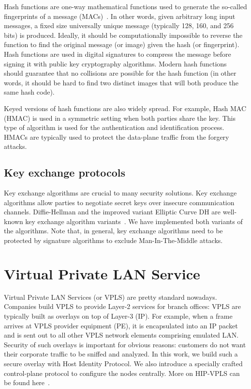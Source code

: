 Hash functions are one-way mathematical functions used to generate the so-called 
fingerprints of a message (MACs)~\cite{Stinson:Cryptography}. In other words, given arbitrary long input messages, 
a fixed size universally unique message (typically 128, 160, and 256 bits) is produced. 
Ideally, it should be computationally impossible to reverse the function to find the 
original message (or image) given the hash (or fingerprint). Hash functions are used 
in digital signatures to compress the message before signing it with public key 
cryptography algorithms. Modern hash functions should guarantee that no collisions 
are possible for the hash function (in other words, it should be hard to find two 
distinct images that will both produce the same hash code). 

Keyed versions of hash functions are also widely spread. For example, Hash MAC (HMAC) 
is used in a symmetric setting when both parties share the key. This type of algorithm 
is used for the authentication and identification process. HMACs are typically used 
to protect the data-plane traffic from the forgery attacks. 


\subsection{Key exchange protocols}

Key exchange algorithms are crucial to many security solutions. Key exchange algorithms 
allow parties to negotiate secret keys over insecure communication channels. Diffie-Hellman 
and the improved variant Elliptic Curve DH are well-known key exchange algorithm variants~\cite{Stinson:Cryptography}. 
We have implemented both variants of the algorithms. Note that, in general, key exchange 
algorithms need to be protected by signature algorithms to exclude Man-In-The-Middle attacks.

\section{Virtual Private LAN Service}

Virtual Private LAN Services (or VPLS) are pretty standard nowadays. Companies build VPLS to 
provide Layer-2 services for branch offices: VPLS are typically built as overlays on top of 
Layer-3 (IP). For example, when a frame arrives at VPLS provider equipment (PE), it is encapsulated 
into an IP packet and is sent out to all other VPLS network elements comprising emulated LAN. 
Security of such overlays is important for obvious reasons: customers do not want their corporate 
traffic to be sniffed and analyzed. In this work, we build such a secure overlay with Host Identity 
Protocol. We also introduce a specially crafted control-plane protocol to configure the nodes centrally. 
More on HIP-VPLS can be found here~\cite{hipvpls}.

